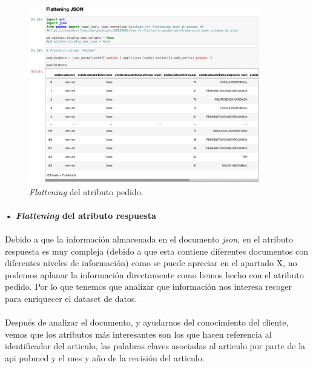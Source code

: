 \documentclass[10pt,a4paper,oneside]{book}
\begin{document}
\paragraph{}
\begin{figure}[!htb]
  \centering
  \includegraphics[width=0.9\textwidth]{images/metodologia-aplanar-pedido.png}
  \caption{\textit{Flattening} del atributo pedido.}
\end{figure}

\paragraph{• \textit{Flattening} del atributo respuesta}

\paragraph{}
Debido a que la información almacenada en el documento \textit{json}, en el atributo respuesta es muy compleja (debido a que esta contiene diferentes documentos con diferentes niveles de información) como se puede apreciar en el apartado X, no podemos aplanar la información directamente como hemos hecho con el atributo pedido. Por lo que tenemos que analizar que información nos interesa recoger para enriquecer el dataset de datos.

\paragraph{}
Después de analizar el documento, y ayudarnos del conocimiento del cliente, vemos que los atributos más interesantes son los que hacen referencia al identificador del articulo, las palabras claves asociadas al articulo por parte de la api pubmed y el mes y año de la revisión del articulo.
\end{document}
